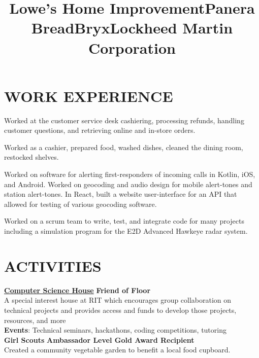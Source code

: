\documentclass[line,margin]{res}
\begin{document}
\begin{resume}
\section{WORK EXPERIENCE}
\title{\textbf{Lowe's Home Improvement}}
\begin{position}
    Worked at the customer service desk cashiering, processing refunds, handling customer questions, and retrieving online and in-store orders.
\end{position}
\title{\textbf{Panera Bread}}
\begin{position}
    Worked as a cashier, prepared food, washed dishes, cleaned the dining room, restocked shelves.
\end{position}
\title{\textbf{Bryx}}
\begin{position}
    Worked on software for alerting first-responders of incoming calls in Kotlin, iOS, and Android. Worked on geocoding and audio design for mobile alert-tones and station alert-tones. In React, built a website user-interface for an API that allowed for testing of various geocoding software.
\end{position}
\title{\textbf{Lockheed Martin Corporation}}
\begin{position}
    Worked on a scrum team to write, test, and integrate code for many projects including a simulation program for the E2D Advanced Hawkeye radar system.
\end{position}

\section{ACTIVITIES}
\href{https://csh.rit.edu}{\textbf{Computer Science House}}
\hfill
\textbf{Friend of Floor}\\
A special interest house at RIT which encourages group collaboration on technical 
projects and provides access and funds to develop those projects, resources, and more\\
\textbf{Events}: 
Technical seminars, hackathons, coding competitions, tutoring\\

\textbf{Girl Scouts} \hfill \textbf{Ambassador Level Gold Award Recipient}\\
Created a community vegetable garden to benefit a local food cupboard.

\end{resume}
\end{document}
